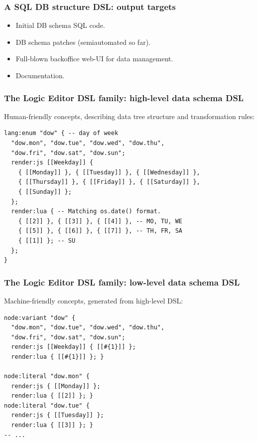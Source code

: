 \documentclass[handout]{beamer}
\begin{document}

\begin{frame}

\frametitle{A SQL DB structure DSL: output targets}

\begin{itemize}
\item Initial DB schema SQL code.
\item DB schema patches (semiautomated so far).
\item Full-blown backoffice web-UI for data management.
\item Documentation.
\end{itemize}

\end{frame}


\begin{frame}[fragile]

\frametitle{The Logic Editor DSL family: high-level data schema DSL}

Human-friendly concepts, describing data tree structure and transformation rules:

\begin{verbatim}
lang:enum "dow" { -- day of week
  "dow.mon", "dow.tue", "dow.wed", "dow.thu",
  "dow.fri", "dow.sat", "dow.sun";
  render:js [[Weekday]] {
    { [[Monday]] }, { [[Tuesday]] }, { [[Wednesday]] },
    { [[Thursday]] }, { [[Friday]] }, { [[Saturday]] },
    { [[Sunday]] };
  };
  render:lua { -- Matching os.date() format.
    { [[2]] }, { [[3]] }, { [[4]] }, -- MO, TU, WE
    { [[5]] }, { [[6]] }, { [[7]] }, -- TH, FR, SA
    { [[1]] }; -- SU
  };
}
\end{verbatim}

\end{frame}


\begin{frame}[fragile]

\frametitle{The Logic Editor DSL family: low-level data schema DSL}

Machine-friendly concepts, generated from high-level DSL:

\begin{verbatim}
node:variant "dow" {
  "dow.mon", "dow.tue", "dow.wed", "dow.thu",
  "dow.fri", "dow.sat", "dow.sun";
  render:js [[Weekday]] { [[#{1}]] };
  render:lua { [[#{1}]] }; }

node:literal "dow.mon" {
  render:js { [[Monday]] };
  render:lua { [[2]] }; }
node:literal "dow.tue" {
  render:js { [[Tuesday]] };
  render:lua { [[3]] }; }
-- ...
\end{verbatim}

\end{frame}
\end{document}
